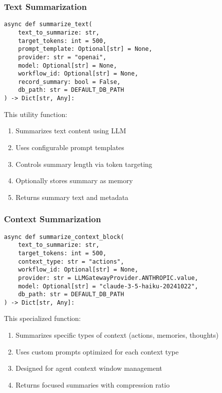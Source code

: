 \documentclass[12pt,a4paper]{article}
\begin{document}
\subsubsection*{Text Summarization}
\begin{pageablecode}
\begin{verbatim}
async def summarize_text(
    text_to_summarize: str,
    target_tokens: int = 500,
    prompt_template: Optional[str] = None,
    provider: str = "openai",
    model: Optional[str] = None,
    workflow_id: Optional[str] = None,
    record_summary: bool = False,
    db_path: str = DEFAULT_DB_PATH
) -> Dict[str, Any]:
\end{verbatim}
\end{pageablecode}
This utility function:
\begin{enumerate}[label=\arabic*.]
    \item Summarizes text content using LLM
    \item Uses configurable prompt templates
    \item Controls summary length via token targeting
    \item Optionally stores summary as memory
    \item Returns summary text and metadata
\end{enumerate}

\subsubsection*{Context Summarization}
\begin{pageablecode}
\begin{verbatim}
async def summarize_context_block(
    text_to_summarize: str,
    target_tokens: int = 500,
    context_type: str = "actions",
    workflow_id: Optional[str] = None,
    provider: str = LLMGatewayProvider.ANTHROPIC.value,
    model: Optional[str] = "claude-3-5-haiku-20241022",
    db_path: str = DEFAULT_DB_PATH
) -> Dict[str, Any]:
\end{verbatim}
\end{pageablecode}
This specialized function:
\begin{enumerate}[label=\arabic*.]
    \item Summarizes specific types of context (actions, memories, thoughts)
    \item Uses custom prompts optimized for each context type
    \item Designed for agent context window management
    \item Returns focused summaries with compression ratio
\end{enumerate}
\end{document}
